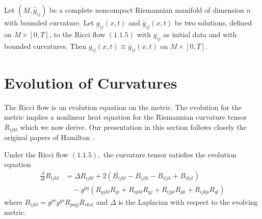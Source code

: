 \begin{theorem}
  \label{thm:cz-bounded-curvature-uniqueness-on-complete-noncompact-manifolds}
Let $(M, \hat{g}_{ij})$ be a complete noncompact Riemannian
manifold of dimension $n$ with bounded curvature. Let
${g}_{ij}(x,t)$ and $\bar{g}_{ij}(x,t)$ be two solutions, defined
on $M\times[0,T]$, to the Ricci flow $(1.1.5)$ with $\hat{g}_{ij}$
as initial data and with bounded curvatures. Then
$g_{ij}(x,t)\equiv \bar{g}_{ij}(x,t)$ on $M\times[0,T]$.
\end{theorem}


\section{Evolution of Curvatures}

The Ricci flow is an evolution equation on the metric. The
evolution for the metric implies a nonlinear heat equation for the
Riemannian curvature tensor $R_{ijkl}$ which we now derive. Our
presentation in this section follows closely the original papers
of Hamilton \cite{Ha82, Ha86}.

\begin{proposition}
  \label{prop:cz-evolution-of-the-riemann-curvature-tensor}
Under the Ricci flow $(1.1.5),$ the curvature tensor satisfies the
evolution equation
\begin{align*}
\frac{\partial}{\partial t}R_{ijkl}&  = \Delta
R_{ijkl}+2(B_{ijkl}-B_{ijlk}-B_{iljk}+B_{ikjl})\\
& \quad
-g^{pq}(R_{pjkl}R_{qi}+R_{ipkl}R_{qj}+R_{ijpl}R_{qk}+R_{ijkp}R_{ql})
\end{align*}
where $B_{ijkl}=g^{pr}g^{qs}R_{piqj}R_{rksl}$ and $\Delta$ is the
Laplacian with respect to the evolving metric.
\end{proposition}


